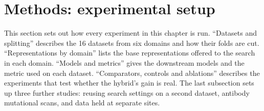\section{Methods: experimental setup}
This section sets out how every experiment in this chapter is run. ``Datasets and splitting'' describes the 16 datasets from six domains and how their folds are cut. ``Representations by domain'' lists the base representations offered to the search in each domain. ``Models and metrics'' gives the downstream models and the metric used on each dataset. ``Comparators, controls and ablations'' describes the experiments that test whether the hybrid's gain is real. The last subsection sets up three further studies: reusing search settings on a second dataset, antibody mutational scans, and data held at separate sites.

